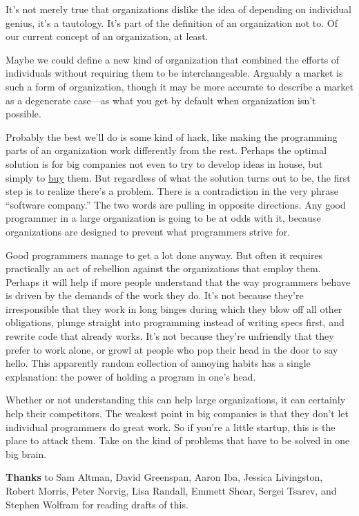 \documentclass[12pt]{book}
\begin{document}
It's not merely true that organizations dislike the idea of depending on
individual genius, it's a tautology. It's part of the definition of an
organization not to. Of our current concept of an organization, at
least.

Maybe we could define a new kind of organization that combined the
efforts of individuals without requiring them to be interchangeable.
Arguably a market is such a form of organization, though it may be more
accurate to describe a market as a degenerate case---as what you get by
default when organization isn't possible.

Probably the best we'll do is some kind of hack, like making the
programming parts of an organization work differently from the rest.
Perhaps the optimal solution is for big companies not even to try to
develop ideas in house, but simply to \href{hiring.html}{buy} them. But
regardless of what the solution turns out to be, the first step is to
realize there's a problem. There is a contradiction in the very phrase
``software company.'' The two words are pulling in opposite directions.
Any good programmer in a large organization is going to be at odds with
it, because organizations are designed to prevent what programmers
strive for.

Good programmers manage to get a lot done anyway. But often it requires
practically an act of rebellion against the organizations that employ
them. Perhaps it will help if more people understand that the way
programmers behave is driven by the demands of the work they do. It's
not because they're irresponsible that they work in long binges during
which they blow off all other obligations, plunge straight into
programming instead of writing specs first, and rewrite code that
already works. It's not because they're unfriendly that they prefer to
work alone, or growl at people who pop their head in the door to say
hello. This apparently random collection of annoying habits has a single
explanation: the power of holding a program in one's head.

Whether or not understanding this can help large organizations, it can
certainly help their competitors. The weakest point in big companies is
that they don't let individual programmers do great work. So if you're a
little startup, this is the place to attack them. Take on the kind of
problems that have to be solved in one big brain.

\textbf{Thanks} to Sam Altman, David Greenspan, Aaron Iba, Jessica
Livingston, Robert Morris, Peter Norvig, Lisa Randall, Emmett Shear,
Sergei Tsarev, and Stephen Wolfram for reading drafts of this.
\end{document}
